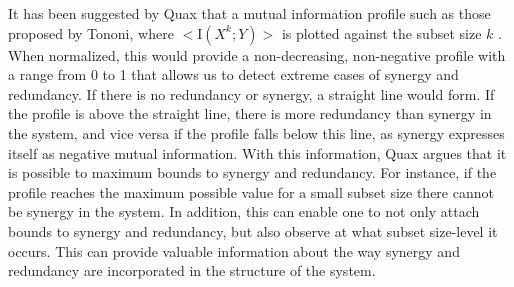 \documentclass[../main.tex]{subfiles}
\begin{document}
It has been suggested by Quax that a mutual information profile such as those proposed by Tononi, where $< \mathrm{I}\left( X^k;Y \right) >$ is plotted against the subset size $k$ \cite{QuaxPersonal, tononi1999measures}. 
When normalized, this would provide a non-decreasing, non-negative profile with a range from 0 to 1 that allows us to detect extreme cases of synergy and redundancy.
If there is no redundancy or synergy, a straight line would form.
If the profile is above the straight line, there is more redundancy than synergy in the system, and vice versa if the profile falls below this line, as synergy expresses itself as negative mutual information.
With this information, Quax argues that it is possible to maximum bounds to synergy and redundancy.
For instance, if the profile reaches the maximum possible value for a small subset size there cannot be synergy in the system.
In addition, this can enable one to not only attach bounds to synergy and redundancy, but also observe at what subset size-level it occurs.
This can provide valuable information about the way synergy and redundancy are incorporated in the structure of the system.

\end{document}
